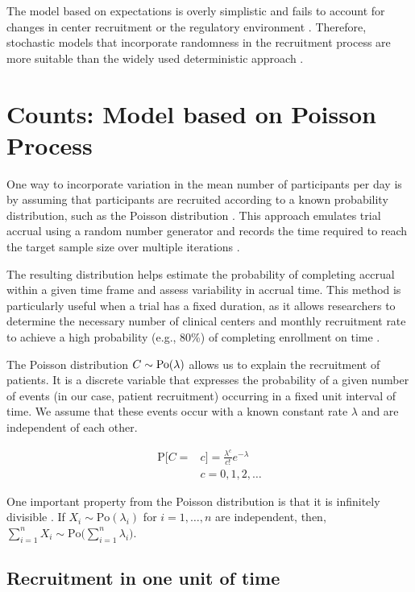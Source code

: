 The model based on expectations is overly simplistic and fails to account for changes in center recruitment or the regulatory environment \citep{barnard2010systematic}. Therefore, stochastic models that incorporate randomness in the recruitment process are more suitable than the widely used deterministic approach \citep{zhang2012modeling}.

\section{Counts: Model based on Poisson Process}

One way to incorporate variation in the mean number of participants per day is by assuming that participants are recruited according to a known probability distribution, such as the Poisson distribution \citep{carter2004application}. This approach emulates trial accrual using a random number generator and records the time required to reach the target sample size over multiple iterations \citep{carter2005practical}. 

The resulting distribution helps estimate the probability of completing accrual within a given time frame and assess variability in accrual time. This method is particularly useful when a trial has a fixed duration, as it allows researchers to determine the necessary number of clinical centers and monthly recruitment rate to achieve a high probability (e.g., 80\%) of completing enrollment on time \citep{carter2005practical}.

The Poisson distribution $C\sim \rm{Po} (\lambda)$ allows us to explain the recruitment of patients. It is a discrete variable that expresses the probability of a given number of events (in our case, patient recruitment) occurring in a fixed unit interval of time. We assume that these events occur with a known constant rate $\lambda$ and are independent of each other.

\begin{align*}
\textrm{P}[C=&c] = \frac{\lambda^c}{c!}e^{-\lambda} \\
&c = 0,1,2,\ldots
\end{align*}


One important property from the Poisson distribution is that it is infinitely divisible \citep{held2014applied}. If $X_i\sim \textrm{Po} (\lambda_i)$ for $i=1,\ldots, n$ are independent, then, $\sum_{i=1}^n X_i \sim \textrm{Po} \Big( \sum_{i=1}^n \lambda_i \Big)$.

\subsection{Recruitment in one unit of time}


